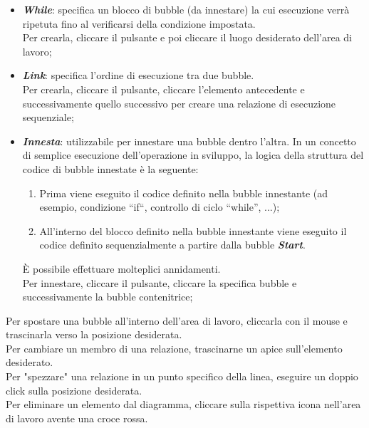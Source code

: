 \documentclass[../ManualeUtente.tex]{subfiles}
\begin{document}
\begin{itemize}
					\item \textit{\textbf{While}}: specifica un blocco di bubble (da innestare) la cui esecuzione
					verrà ripetuta fino al verificarsi della condizione impostata.\\
					Per crearla, cliccare il pulsante e poi cliccare il luogo desiderato
					dell'area di lavoro;
					\item \textit{\textbf{Link}}: specifica l'ordine di esecuzione tra due bubble.\\
					Per crearla, cliccare il pulsante, cliccare l'elemento antecedente
					e successivamente quello successivo per creare una relazione di esecuzione sequenziale;
					\item \textit{\textbf{Innesta}}: utilizzabile per innestare una bubble dentro l'altra.
					In un concetto di semplice esecuzione dell'operazione in sviluppo, la
					logica della struttura del codice di bubble innestate è la seguente:
					\begin{enumerate}
						\item Prima viene eseguito il codice definito nella bubble innestante (ad esempio,
						condizione ``if``, controllo di ciclo ``while'', ...);
						\item All'interno del blocco definito nella bubble innestante viene eseguito il codice
						definito sequenzialmente a partire dalla bubble \textit{\textbf{Start}}.
					\end{enumerate}
					È possibile effettuare molteplici annidamenti.\\
					Per innestare, cliccare il pulsante, cliccare la specifica bubble
					e successivamente la bubble contenitrice;
				\end{itemize}
				Per spostare una bubble all'interno dell'area di lavoro,
				cliccarla con il mouse e trascinarla verso la posizione desiderata.\\
				Per cambiare un membro di una relazione, trascinarne un apice sull'elemento
				desiderato.\\
				Per "spezzare" una relazione in un punto specifico della linea, eseguire un doppio click sulla
				posizione desiderata.\\
				Per eliminare un elemento dal diagramma, cliccare sulla rispettiva icona nell'area di lavoro
				avente una croce rossa.
\end{document}
